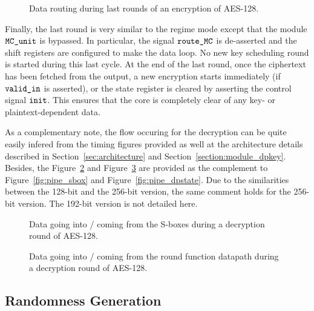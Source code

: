 \documentclass{scrartcl}
\begin{document}
\begin{figure}
    \centering
     
    \caption{Data routing during last rounds of an encryption of AES-128.}
    \label{fig:time_last_round}
\end{figure}

Finally, the last round is very similar to the regime mode except that the
module $\texttt{MC\_unit}$ is bypassed. In particular, the signal
$\texttt{route\_MC}$ is de-asserted and the shift registers are configured to
make the data loop. No new key scheduling round is started during this last
cycle.
At the end of the last round, once the ciphertext has been fetched from the
output, a new encryption starts immediately (if $\texttt{valid\_in}$ is asserted),
or the state register is cleared by asserting the control signal
$\texttt{init}$.
This ensures that the core is completely clear of any key- or
plaintext-dependent data.


As a complementary note, the flow occuring for the decryption can be quite
easily infered from the timing figures provided as well at the architecture
details described in Section~\ref{sec:architecture} and
Section~\ref{section:module_dpkey}. Besides, the
Figure~\ref{fig:pipe_sbox_decryption} and
Figure~\ref{fig:pipe_dpstate_decryption} are provided as the complement to
Figure~\ref{fig:pipe_sbox} and Figure~\ref{fig:pipe_dpstate}.  Due to the
similarities between the 128-bit and the 256-bit version, the same comment
holds for the 256-bit version. The 192-bit version is not detailed here. 

\begin{figure}
    \centering
    
    \caption{Data going into / coming from the S-boxes during a decryption round of AES-128.}
    \label{fig:pipe_sbox_decryption}
\end{figure}

\begin{figure}
    \centering
    
    \caption{Data going into / coming from the round function datapath during a decryption round of AES-128.}
    \label{fig:pipe_dpstate_decryption}
\end{figure}


\subsection{Randomness Generation} 

\end{document}
